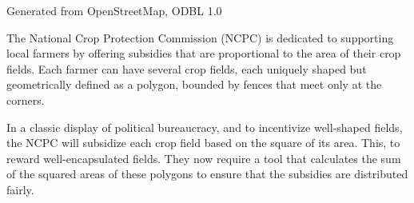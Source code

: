 
    {Generated from OpenStreetMap, ODBL 1.0}

The National Crop Protection Commission (NCPC) is dedicated to supporting
local farmers by offering subsidies that are proportional to the area of
their crop fields.
Each farmer can have several crop fields, each uniquely shaped but
geometrically defined as a polygon, bounded by fences
that meet only at the corners.

In a classic display of political bureaucracy, and to incentivize
well-shaped fields, the NCPC will subsidize each crop field based on the
square of its area.
This, to reward well-encapsulated fields.
They now require a tool that calculates the sum of the squared areas of these
polygons to ensure that the subsidies are distributed fairly.

